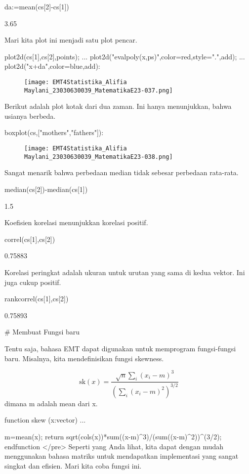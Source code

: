 \documentclass{article}
\begin{document}
\>da:=mean(cs[2]-cs[1])


    3.65

Mari kita plot ini menjadi satu plot pencar.


\>plot2d(cs[1],cs[2],\>points);  ...  
\>   plot2d("evalpoly(x,ps)",color=red,style=".",\>add);  ...  
\>   plot2d("x+da",color=blue,\>add):


\begin{figure}
    \centering
    \texttt{[image: EMT4Statistika\_Alifia Maylani\_23030630039\_MatematikaE23-037.png]}
    \caption{}
    \label{fig:enter-label}
\end{figure}

Berikut adalah plot kotak dari dua zaman. Ini hanya menunjukkan, bahwa
usianya berbeda.


\>boxplot(cs,["mothers","fathers"]):


\begin{figure}
    \centering
    \texttt{[image: EMT4Statistika\_Alifia Maylani\_23030630039\_MatematikaE23-038.png]}
    \caption{}
    \label{fig:enter-label}
\end{figure}

Sangat menarik bahwa perbedaan median tidak sebesar perbedaan
rata-rata.


\>median(cs[2])-median(cs[1])


    1.5

Koefisien korelasi menunjukkan korelasi positif.


\>correl(cs[1],cs[2])


    0.75883

Korelasi peringkat adalah ukuran untuk urutan yang sama di kedua
vektor. Ini juga cukup positif.


\>rankcorrel(cs[1],cs[2])


    0.75893

# Membuat Fungsi baru

Tentu saja, bahasa EMT dapat digunakan untuk memprogram fungsi-fungsi
baru. Misalnya, kita mendefinisikan fungsi skewness.


$$\text{sk}(x) = \dfrac{\sqrt{n} \sum_i (x_i-m)^3}{\left(\sum_i (x_i-m)^2\right)^{3/2}}$$dimana m adalah mean dari x.


\>function skew (x:vector) ...


    m=mean(x);
    return sqrt(cols(x))*sum((x-m)^3)/(sum((x-m)^2))^(3/2);
    endfunction
</pre>
Seperti yang Anda lihat, kita dapat dengan mudah menggunakan bahasa
matriks untuk mendapatkan implementasi yang sangat singkat dan
efisien. Mari kita coba fungsi ini.
\end{document}
